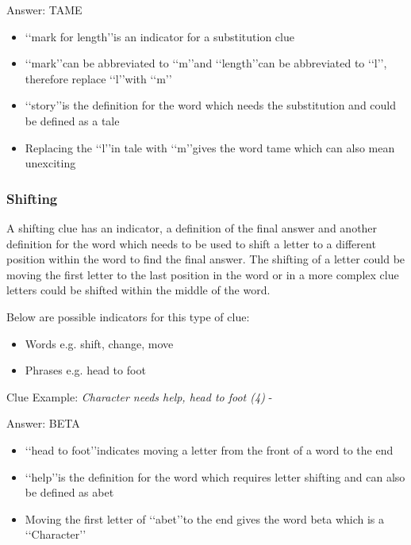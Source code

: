 Answer: TAME 

\begin{itemize}
	\item \lq\lq mark for length\rq\rq is an indicator for a substitution clue  
	\item \lq\lq mark\rq\rq can be abbreviated to \lq\lq m\rq\rq and \lq\lq length\rq\rq can be abbreviated to \lq\lq l\rq\rq, therefore replace \lq\lq l\rq\rq with \lq\lq m\rq\rq 
	\item \lq\lq story\rq\rq is the definition for the word which needs the substitution and could be defined as a tale 
	\item Replacing the \lq\lq l\rq\rq in tale with \lq\lq m\rq\rq gives the word tame which can also mean unexciting 
\end{itemize}

\subsubsection{Shifting}

A shifting clue has an indicator, a definition of the final answer and another definition for the word which needs to be used to shift a letter to a different position within the word to find the final answer. The shifting of a letter could be moving the first letter to the last position in the word or in a more complex clue letters could be shifted within the middle of the word.  

Below are possible indicators for this type of clue:
\begin{itemize} 
	\item Words e.g. shift, change, move 
	\item Phrases e.g. head to foot 
\\
\end{itemize}

Clue Example: \emph{Character needs help, head to foot (4)}  - \citep{shuchiShifting09} 

Answer: BETA 

\begin{itemize}
	\item \lq\lq head to foot\rq\rq indicates moving a letter from the front of a word to the end 
	\item \lq\lq help\rq\rq is the definition for the word which requires letter shifting and can also be defined as abet 
	\item Moving the first letter of \lq\lq abet\rq\rq to the end gives the word beta which is a \lq\lq Character\rq\rq
\end{itemize}

